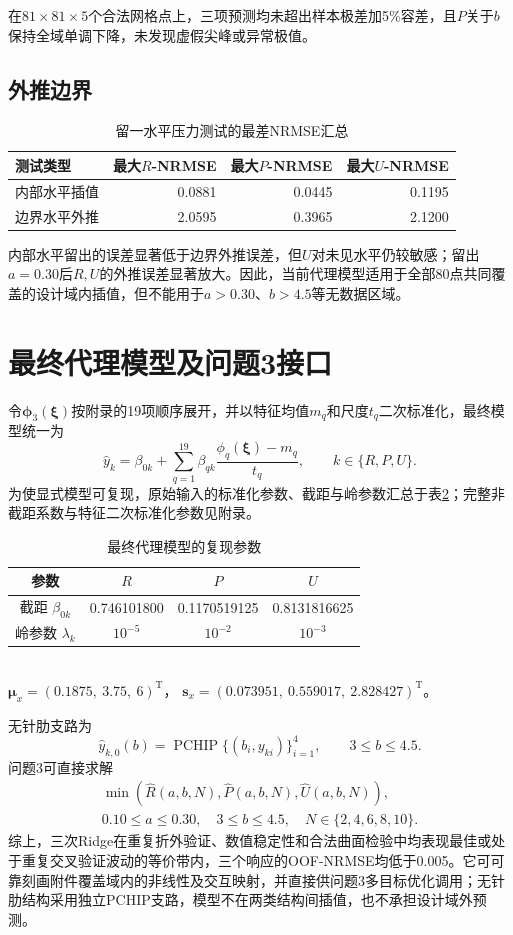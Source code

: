 \documentclass[UTF8,12pt,a4paper]{ctexart}
\begin{document}
在$81\times81\times5$个合法网格点上，三项预测均未超出样本极差加5\%容差，且$P$关于$b$保持全域单调下降，未发现虚假尖峰或异常极值。

\subsection{外推边界}
\begin{table}[H]\centering\small
\caption{留一水平压力测试的最差NRMSE汇总}\label{tab:boundary}
\begin{tabular}{lrrr}
\toprule
测试类型 & 最大$R$-NRMSE & 最大$P$-NRMSE & 最大$U$-NRMSE \\
\midrule
内部水平插值 & 0.0881 & 0.0445 & 0.1195 \\
边界水平外推 & 2.0595 & 0.3965 & 2.1200 \\
\bottomrule
\end{tabular}
\end{table}

内部水平留出的误差显著低于边界外推误差，但$U$对未见水平仍较敏感；留出$a=0.30$后$R,U$的外推误差显著放大。因此，当前代理模型适用于全部80点共同覆盖的设计域内插值，但不能用于$a>0.30$、$b>4.5$等无数据区域。

\section{最终代理模型及问题3接口}
令$\bm\phi_3(\bm\xi)$按附录的19项顺序展开，并以特征均值$m_q$和尺度$t_q$二次标准化，最终模型统一为
\[
\widehat y_k=\beta_{0k}+\sum_{q=1}^{19}\beta_{qk}\frac{\phi_q(\bm\xi)-m_q}{t_q},\qquad k\in\{R,P,U\}.
\]
为使显式模型可复现，原始输入的标准化参数、截距与岭参数汇总于表\ref{tab:reproduce}；完整非截距系数与特征二次标准化参数见附录。
\begin{table}[H]\centering\small
\caption{最终代理模型的复现参数}\label{tab:reproduce}
\begin{tabular}{cccc}
\toprule
参数 & $R$ & $P$ & $U$ \\
\midrule
截距 $\beta_{0k}$ & 0.746101800 & 0.1170519125 & 0.8131816625 \\
岭参数 $\lambda_k$ & $10^{-5}$ & $10^{-2}$ & $10^{-3}$ \\
\bottomrule
\end{tabular}\\[3pt]
$\bm\mu_x=(0.1875,\ 3.75,\ 6)^{\mathrm T}$，\quad
$\bm s_x=(0.073951,\ 0.559017,\ 2.828427)^{\mathrm T}$。
\end{table}
无针肋支路为
\[
\widehat y_{k,0}(b)=\operatorname{PCHIP}\{(b_i,y_{ki})\}_{i=1}^{4},\qquad 3\le b\le4.5.
\]
问题3可直接求解
\[
\begin{gathered}
\min\left(\widehat R(a,b,N),\widehat P(a,b,N),\widehat U(a,b,N)\right),\\
0.10\le a\le0.30,\quad3\le b\le4.5,\quad N\in\{2,4,6,8,10\}.
\end{gathered}
\]
综上，三次Ridge在重复折外验证、数值稳定性和合法曲面检验中均表现最佳或处于重复交叉验证波动的等价带内，三个响应的OOF-NRMSE均低于0.005。它可可靠刻画附件覆盖域内的非线性及交互映射，并直接供问题3多目标优化调用；无针肋结构采用独立PCHIP支路，模型不在两类结构间插值，也不承担设计域外预测。
\end{document}

